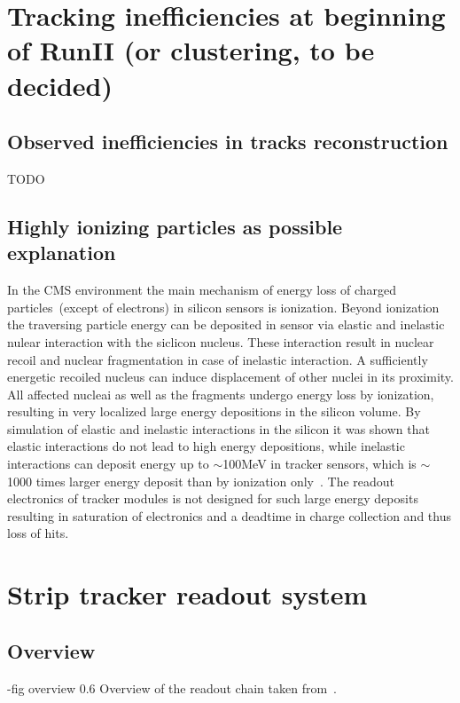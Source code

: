 
\section{Tracking inefficiencies at beginning of RunII (or clustering, to be decided)}

\subsection{Observed inefficiencies in tracks reconstruction}
 TODO

\subsection{Highly ionizing particles as possible explanation}

In the CMS environment the main mechanism of energy loss of charged particles~(except of electrons) in silicon sensors is ionization. Beyond ionization the traversing particle energy can be deposited in sensor via elastic and inelastic nulear interaction with the siclicon nucleus. These interaction result in nuclear recoil and nuclear fragmentation in case of inelastic interaction. A sufficiently energetic recoiled nucleus can induce displacement of other nuclei in its proximity. All affected nucleai as well as the fragments undergo energy loss by ionization, resulting in very localized large energy depositions in the silicon volume. By simulation of elastic and inelastic interactions in the silicon it was shown that elastic interactions do not lead to high energy depositions, while inelastic interactions can deposit energy up to $\sim$100MeV in tracker sensors, which is $\sim$1000 times larger energy deposit than by ionization only~\cite{Huhtinen:2002yda}. The readout electronics of tracker modules is not designed for such large energy deposits resulting in saturation of electronics and a deadtime in charge collection and thus loss of hits.

\section{Strip tracker readout system}

\subsection{Overview}

-fig overview
                 {0.6}       %
                 {Overview of the readout chain taken from~\cite{Bainbridge:2004jc}.} %

